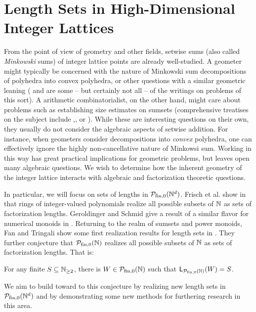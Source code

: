 \chapter{Length Sets in High-Dimensional Integer Lattices} \label{ch:lattices}

From the point of view of geometry and other fields, setwise sums (also called \textit{Minkowski} sums) of integer lattice points are already well-studied.
A geometer might typically be concerned with the nature of Minkowski sum decompositions of polyhedra into convex polyhedra, or other questions with a similar geometric leaning (\cite{morelli93} and \cite{wang-gong07} are some -- but certainly not all -- of the writings on problems of this sort).
A arithmetic combinatorialist, on the other hand, might care about problems such as establishing size estimates on sumsets (comprehensive treatises on the subject include \cite{tao_vu_2006},\cite{grynkiewicz13}, or \cite{geroldinger-ruzsa09}).
While these are interesting questions on their own, they usually do not consider the algebraic aspects of setwise addition.  
For instance, when geometers consider decompositions into \textit{convex} polyhedra, one can effectively ignore the highly non-cancellative nature of Minkowsi sum.  
Working in this way has great practical implications for geometric problems, but leaves open many algebraic questions.
We wish to determine how the inherent geometry of the integer lattice interacts with algebraic and factorization theoretic questions.  

In particular, we will focus on sets of lengths in $\mathcal{P}_{\textrm{fin}, 0}(\mathbb{N}^d)$.
Frisch et al. show in \cite{frisch13,frisch-al19} that rings of integer-valued polynomials realize all possible subsets of $\mathbb{N}$ as sets of factorization lengths. 
Geroldinger and Schmid give a result of a similar flavor for numerical monoids in \cite{geroldinger-schmid18}.
Returning to the realm of sumsets and power monoids, Fan and Tringali show some first realization results for length sets in \cite{fan-tringali18}.
They further conjecture that ${\mathcal{P}_{\textrm{fin},0}(\mathbb{N})}$ realizes all possible subsets of $\mathbb{N}$ as sets of factorization lengths.
That is:
\begin{conj} \label{conj:lengths}
For any finite $S \subseteq \mathbb{N}_{\ge 2}$, there is $W\in{\mathcal{P}_{\textrm{fin},0}(\mathbb{N})}$ such that $\mathsf{L}_{\mathcal{P}_{\textrm{fin},0}(\mathbb{N})}(W)=S$.
\end{conj}
We aim to build toward to this conjecture by realizing new length sets in $\mathcal{P}_{\textrm{fin}, 0}(\mathbb{N}^d)$ and by demonstrating some new methods for furthering research in this area.


